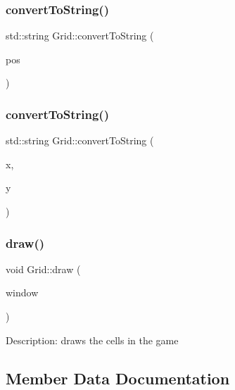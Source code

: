 \subsubsection{\texorpdfstring{convertToString()}{convertToString()}\hspace{0.1cm}{\footnotesize\ttfamily [1/2]}}
{\footnotesize\ttfamily std\+::string Grid\+::convert\+To\+String (\begin{DoxyParamCaption}\item[{sf\+::\+Vector2i}]{pos }\end{DoxyParamCaption})}

\mbox{\label{class_grid_a0bb1f758e9bec3d4f083d52d42fdeedd}} 
\subsubsection{\texorpdfstring{convertToString()}{convertToString()}\hspace{0.1cm}{\footnotesize\ttfamily [2/2]}}
{\footnotesize\ttfamily std\+::string Grid\+::convert\+To\+String (\begin{DoxyParamCaption}\item[{int}]{x,  }\item[{int}]{y }\end{DoxyParamCaption})}

\mbox{\label{class_grid_a9b42b1d0dcfc434d790b11faf4b461ce}} 
\subsubsection{\texorpdfstring{draw()}{draw()}}
{\footnotesize\ttfamily void Grid\+::draw (\begin{DoxyParamCaption}\item[{sf\+::\+Render\+Window \&}]{window }\end{DoxyParamCaption})}

Description\+: draws the cells in the game 

\subsection{Member Data Documentation}
\mbox{\label{class_grid_aeb22e641359f6de5c09d58c570d08a1e}} 
